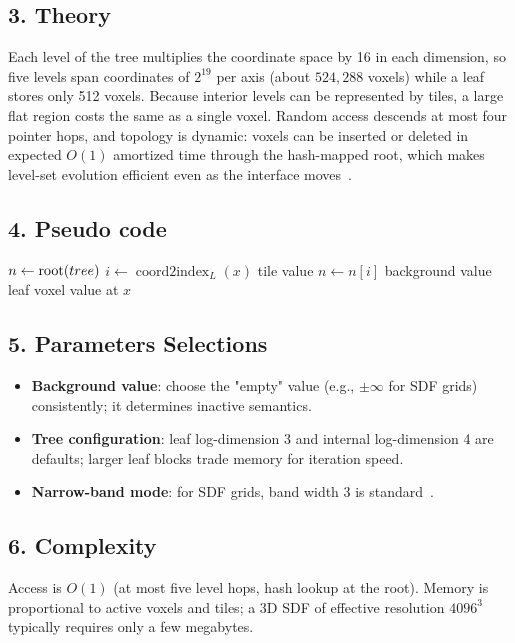 \subsection{3. Theory}
Each level of the tree multiplies the coordinate space by 16 in each
dimension, so five levels span coordinates of $2^{19}$ per axis (about
$524{,}288$ voxels) while a leaf stores only 512 voxels. Because interior
levels can be represented by tiles, a large flat region costs the same as a
single voxel. Random access descends at most four pointer hops, and topology
is dynamic: voxels can be inserted or deleted in expected $O(1)$ amortized
time through the hash-mapped root, which makes level-set evolution efficient
even as the interface moves~\cite{museth2013}.

\subsection{4. Pseudo code}
\begin{algorithmic}
    \State $n \gets \textnormal{root}(tree)$
        \State $i \gets \operatorname{coord2index}_L(x)$
         \State \Return tile value
         \State $n \gets n[i]$
        \Else \State \Return background value
        \EndIf
    \EndFor
    \State \Return leaf voxel value at $x$
\EndFunction
\end{algorithmic}

\subsection{5. Parameters Selections}
\begin{itemize}
    \item \textbf{Background value}: choose the "empty" value (e.g., $\pm\infty$ for SDF grids) consistently; it determines inactive semantics.
    \item \textbf{Tree configuration}: leaf log-dimension 3 and internal log-dimension 4 are defaults; larger leaf blocks trade memory for iteration speed.
    \item \textbf{Narrow-band mode}: for SDF grids, band width 3 is standard~\cite{museth2013}.
\end{itemize}

\subsection{6. Complexity}
Access is $O(1)$ (at most five level hops, hash lookup at the root).
Memory is proportional to active voxels and tiles; a 3D SDF of effective
resolution $4096^3$ typically requires only a few megabytes.

